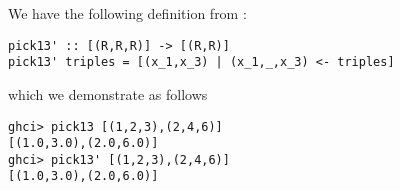 
We have the following definition from :
\scriptsize\begin{verbatim}
pick13' :: [(R,R,R)] -> [(R,R)]
pick13' triples = [(x_1,x_3) | (x_1,_,x_3) <- triples]
\end{verbatim}\normalsize
which we demonstrate as follows
\scriptsize\begin{verbatim}
ghci> pick13 [(1,2,3),(2,4,6)]
[(1.0,3.0),(2.0,6.0)]
ghci> pick13' [(1,2,3),(2,4,6)]
[(1.0,3.0),(2.0,6.0)]
\end{verbatim}\normalsize
